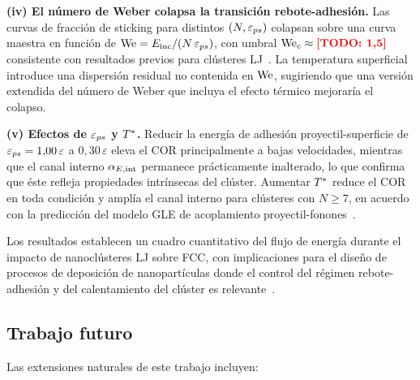 \medskip\noindent
\textbf{(iv) El número de Weber colapsa la transición rebote-adhesión.}
Las curvas de fracción de sticking para distintos $(N, \varepsilon_{ps})$ colapsan
sobre una curva maestra en función de $\mathrm{We} = E_{\mathrm{inc}}/(N\,\varepsilon_{ps})$, con umbral
$\mathrm{We}_c \approx \textcolor{red}{\textbf{[TODO: 1{,}5]}}$ consistente con resultados previos para clústeres
LJ~\cite{awasthi2007}. La temperatura superficial introduce una dispersión
residual no contenida en $\mathrm{We}$, sugiriendo que una versión extendida del número
de Weber que incluya el efecto térmico mejoraría el colapso.

\medskip\noindent
\textbf{(v) Efectos de $\varepsilon_{ps}$ y $T^{*}$.}
Reducir la energía de adhesión proyectil-superficie de $\varepsilon_{ps} = 1{,}00\,\varepsilon$
a $0{,}30\,\varepsilon$ eleva el COR principalmente a bajas velocidades, mientras
que el canal interno $\alpha_{E,\mathrm{int}}$ permanece prácticamente inalterado, lo que
confirma que éste refleja propiedades intrínsecas del clúster. Aumentar $T^{*}$
reduce el COR en toda condición y amplía el canal interno para clústeres con
$N \geq 7$, en acuerdo con la predicción del modelo GLE de acoplamiento
proyectil-fonones~\cite{tully1980}.

\medskip
Los resultados establecen un cuadro cuantitativo del flujo de energía durante
el impacto de nanoclústeres LJ sobre FCC, con implicaciones para el diseño de
procesos de deposición de nanopartículas donde el control del régimen
rebote-adhesión y del calentamiento del clúster es relevante~\cite{haberland1995,
cheng1993}.

\subsection*{Trabajo futuro}

Las extensiones naturales de este trabajo incluyen:

